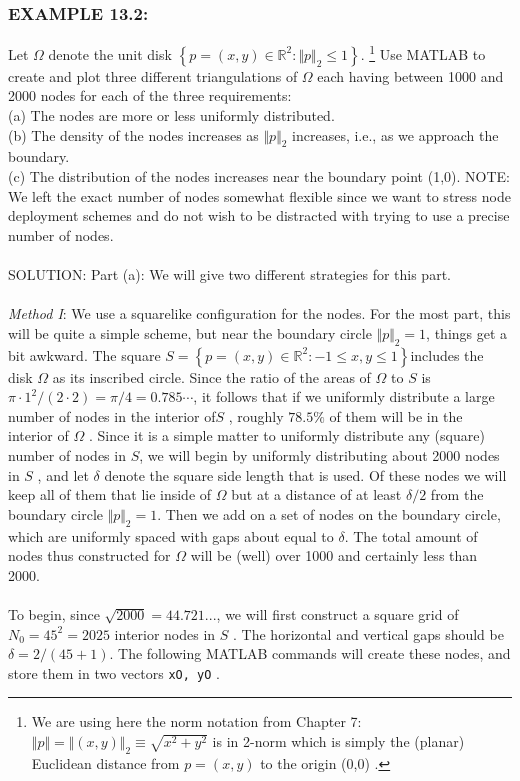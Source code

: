 \documentclass[../main.tex]{subfiles}
\begin{document}
\subsubsection{EXAMPLE 13.2:}
Let $\Omega$ denote the unit disk $\left\{ p=(x,y) \in \mathbb{R}^2: \Vert p \Vert_2 \leqslant 1 \right\}$.
\footnote{We are using here the norm notation from Chapter 7: $\Vert p \Vert = \Vert (x,y)\Vert_2\equiv \sqrt{x^2+y^2}$ is in 2-norm which is simply the (planar) Euclidean distance from $p =(x,y)$ to the origin (0,0) . }
Use MATLAB to create and plot three different triangulations of $\Omega$ each having between 1000 and 2000 nodes for each of the three requirements: 
\\
(a) The nodes are more or less uniformly distributed.
\\ 
(b) The density of the nodes increases as $\Vert p\Vert_2$ increases, i.e., as we approach the boundary.
\\ 
(c) The distribution of the nodes increases near the boundary point (1,0). NOTE: We left the exact number of nodes somewhat flexible since we want to stress node deployment schemes and do not wish to be distracted with trying to use a precise number of nodes.
\\
\\
SOLUTION: Part (a): We will give two different strategies for this part. 
\\
\\
\textit{Method I}: We use a squarelike configuration for the nodes. For the most part, 
this will be quite a simple scheme, but near the boundary circle $\Vert p\Vert_2=1$, things get a bit awkward. The square $S=\left\{ p=(x,y) \in \mathbb{R}^2: -1\leqslant x, y\leqslant1 \right\}$includes the disk $\Omega$ as its inscribed circle. Since the ratio of the areas of $\Omega$ to $S$ is $\pi \cdot 1^2 /(2\cdot 2 ) = \pi/ 4 = 0.785\cdots$, it follows that if we uniformly distribute a large number of nodes in the interior of$S$ , roughly $78.5\%$ of them will be in the interior of $\Omega$ . Since it is a simple matter to uniformly distribute any (square) number of nodes in $S$, we will begin by uniformly distributing about 2000 nodes in $S$ , and let $\delta$ denote the square side length that is used. Of these nodes we will keep all of them that lie inside of $\Omega$ but at a distance of at least $\delta/2$ from the boundary circle $\Vert p \Vert_2=1$. Then we add on a set of nodes on the boundary circle, which are uniformly spaced with gaps about equal to $\delta$. The total amount of nodes thus constructed for $\Omega$ will be (well) over 1000 and certainly less than 2000. 
\\
\\
To begin, since $\sqrt{2000} = 44.721...$, we will first construct a square grid of $N_0 = 45^2 = 2025$ interior nodes in $S$ . The horizontal and vertical gaps should be
$\delta = 2/(45 +1)$. The following MATLAB commands will create these nodes, and 
store them in two vectors \texttt{xO, yO} . 
\end{document}
